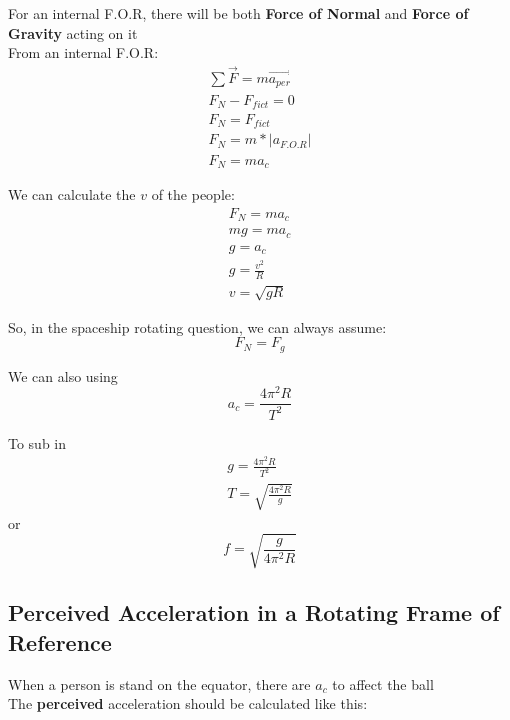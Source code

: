For an internal F.O.R, there will be both \textbf{Force of Normal} and \textbf{Force of Gravity} acting on it\\

From an internal F.O.R:
\begin{gather*}
    \sum \vec{F} = m \vec{a_{per}}\\
    F_{N} - F_{fict} = 0\\
    F_{N} = F_{fict}\\
    F_{N} = m*\left| a_{F.O.R}\right| \\
    F_{N} = ma_{c}
\end{gather*}

We can calculate the $v$ of the people:
\begin{gather*} 
    F_{N} = ma_{c}\\
    mg = ma_{c}\\
    g = a_{c}\\
    g = \frac{v^2}{R}\\
    v = \sqrt{gR}
\end{gather*}

So, in the spaceship rotating question, we can always assume:
\begin{equation*}
    F_{N} = F_{g}
\end{equation*}

We can also using
\begin{equation*}
    a_{c} = \frac{4 \pi^2 R}{T^2}
\end{equation*}

To sub in
\begin{gather*}
    g = \frac{4 \pi^2 R}{T^2}\\
    T = \sqrt{\frac{4 \pi^2 R}{g}}
\end{gather*}
or
\begin{equation*}
    f = \sqrt{\frac{g}{4 \pi^2 R}}
\end{equation*}

\subsection{Perceived Acceleration in a Rotating Frame of Reference}
When a person is stand on the equator, there are $a_{c}$ to affect the ball\\

The \textbf{perceived} acceleration should be calculated like this:

\begin{center}
\end{center}

